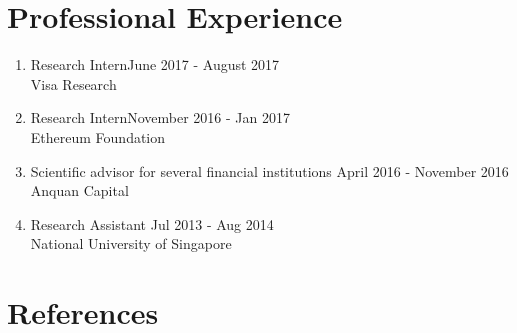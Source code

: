 \documentclass[margin,line]{res}
\begin{document}
\begin{resume}
\begin{enumerate}
\end{enumerate}




  


\section{\sc Professional Experience}
\begin{enumerate}
\item Research Intern\hfill June 2017 - August 2017\\
Visa Research
\item Research Intern\hfill November 2016 - Jan 2017\\
Ethereum Foundation
\item Scientific advisor for several financial institutions \hfill April 2016 - November 2016\\
Anquan Capital
\item Research Assistant \hfill Jul 2013 - Aug 2014\\
National University of Singapore
\end{enumerate}

\section{\sc References} 


\end{resume}
\end{document}
